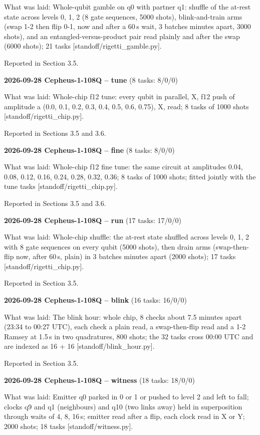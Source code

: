 \documentclass[11pt]{article}
\begin{document}
What was laid: Whole-qubit gamble on q0 with partner q1: shuffle of the at-rest state across levels 0, 1, 2 (8 gate sequences, 5000 shots), blink-and-train arms (swap 1-2 then flip 0-1, now and after a 60\,\textmu s wait, 3 batches minutes apart, 3000 shots), and an entangled-versus-product pair read plainly and after the swap (6000 shots); 21 tasks {[}standoff/rigetti\_gamble.py{]}.

Reported in Section 3.5.

\textbf{2026-09-28 Cepheus-1-108Q -- tune} (8 tasks: 8/0/0)

What was laid: Whole-chip f12 tune: every qubit in parallel, X, f12 push of amplitude a (0.0, 0.1, 0.2, 0.3, 0.4, 0.5, 0.6, 0.75), X, read; 8 tasks of 1000 shots {[}standoff/rigetti\_chip.py{]}.

Reported in Sections 3.5 and 3.6.

\textbf{2026-09-28 Cepheus-1-108Q -- fine} (8 tasks: 8/0/0)

What was laid: Whole-chip f12 fine tune: the same circuit at amplitudes 0.04, 0.08, 0.12, 0.16, 0.24, 0.28, 0.32, 0.36; 8 tasks of 1000 shots; fitted jointly with the tune tasks {[}standoff/rigetti\_chip.py{]}.

Reported in Sections 3.5 and 3.6.

\textbf{2026-09-28 Cepheus-1-108Q -- run} (17 tasks: 17/0/0)

What was laid: Whole-chip shuffle: the at-rest state shuffled across levels 0, 1, 2 with 8 gate sequences on every qubit (5000 shots), then drain arms (swap-then-flip now, after 60\,\textmu s, plain) in 3 batches minutes apart (2000 shots); 17 tasks {[}standoff/rigetti\_chip.py{]}.

Reported in Section 3.5.

\textbf{2026-09-28 Cepheus-1-108Q -- blink} (16 tasks: 16/0/0)

What was laid: The blink hour: whole chip, 8 checks about 7.5 minutes apart (23:34 to 00:27 UTC), each check a plain read, a swap-then-flip read and a 1-2 Ramsey at 1.5\,\textmu s in two quadratures, 800 shots; the 32 tasks cross 00:00 UTC and are indexed as 16 + 16 {[}standoff/blink\_hour.py{]}.

Reported in Section 3.5.

\textbf{2026-09-28 Cepheus-1-108Q -- witness} (18 tasks: 18/0/0)

What was laid: Emitter q0 parked in 0 or 1 or pushed to level 2 and left to fall; clocks q9 and q1 (neighbours) and q10 (two links away) held in superposition through waits of 4, 8, 16\,\textmu s; emitter read after a flip, each clock read in X or Y; 2000 shots; 18 tasks {[}standoff/witness.py{]}.
\end{document}
